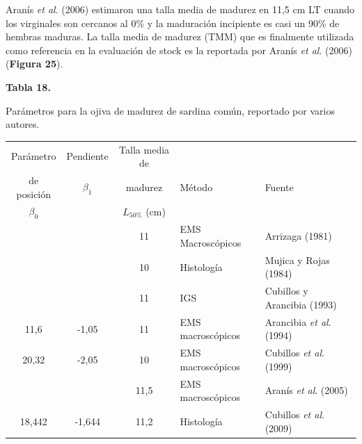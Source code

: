 \documentclass[
  spanish,
]{article}
\begin{document}
Aranís \emph{et al}. (2006) estimaron una talla media de madurez en 11,5
cm LT cuando los virginales son cercanos al 0\% y la maduración
incipiente es casi un 90\% de hembras maduras. La talla media de madurez
(TMM) que es finalmente utilizada como referencia en la evaluación de
stock es la reportada por Aranís \emph{et al}. (2006) (\textbf{Figura
25}). \vspace{0.5cm}

\pagebreak

\small
\begin{center} 
\textbf{Tabla 18.}
\end{center}
\begin{center} 
\vspace{-0.2cm} Parámetros para la ojiva de madurez de sardina común, reportado por varios autores.
\end{center}
\vspace{-0.2cm}

\begin{table}[h]
  \centering
  \resizebox{13cm}{!} {
  \begin{tabular}{|c|c|c|l|l|}
  \hline
 Parámetro     & Pendiente   & Talla media de  &                    &                \\ 
 de posición   & $\beta_1$   &  madurez        & Método             & Fuente         \\ 
 $\beta_0$     &             & $L_{50\%}$ (cm) &                    &    \\ \hline 
               &             & 11              & EMS Macroscópicos  & Arrizaga (1981)            \\
               &             & 10              & Histología         & Mujica y Rojas (1984)      \\
               &             & 11                & IGS                & Cubillos y Arancibia (1993)\\
 11,6            & -1,05         & 11              & EMS macroscópicos  & Arancibia  \textit{et al}. (1994) \\
 20,32         & -2,05       & 10                & EMS macroscópicos  & Cubillos \textit{et al}. (1999)  \\
               &             & 11,5            & EMS macroscópicos  & Aranís \textit{et al}. (2005)    \\
 18,442        & -1,644      & 11,2            & Histología         & Cubillos \textit{et al}. (2009)  \\ \hline
  \end{tabular}}
    \end{table}
\end{document}
